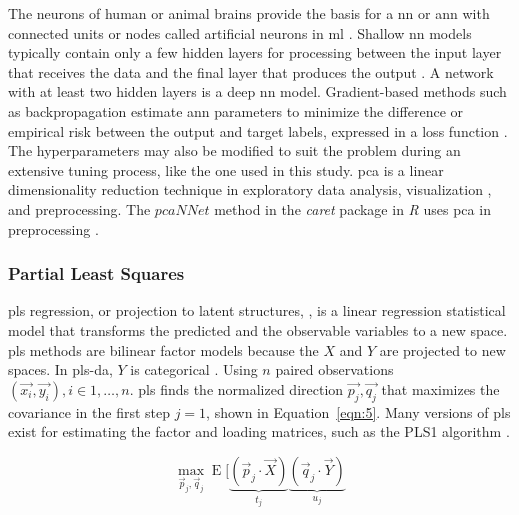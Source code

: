 \let\LaTeXcline\cline\documentclass[sn-mathphys-num]{sn-jnl}\let\cline\LaTeXcline
\begin{document}
The neurons of human or animal brains provide the basis for a \acrfull{nn} or \acrfull{ann} with connected units or nodes called artificial neurons in \acrlong{ml} \cite{brahme2014comprehensive}. Shallow \acrshort{nn} models typically contain only a few hidden layers for processing between the input layer that receives the data and the final layer that produces the output \cite{olden2002illuminating}. A network with at least two hidden layers \cite{bishop2006pattern} is a deep \acrshort{nn} model. Gradient-based methods such as backpropagation estimate \acrshort{ann} parameters \cite{vapnik2013nature} to minimize the difference or empirical risk between the output and target labels, expressed in a loss function \cite{goodfellow2016deep}. The hyperparameters may also be modified to suit the problem \cite{probst2019tunability} during an extensive tuning process, like the one used in this study. \acrfull{pca} \cite{stewart2019introduction} is a linear dimensionality reduction technique in exploratory data analysis, visualization \cite{jolliffe2016principal}, and preprocessing. The $pcaNNet$ method in the \textit{caret} package in \textit{R} uses \acrshort{pca} in preprocessing \cite{Kuhn2007, kuhn2008building, kuhn2013applied}.

\subsubsection{Partial Least Squares}

\acrfull{pls} regression, or projection to latent structures, \cite{abdi2010partial}, is a linear regression statistical model that transforms the predicted and the observable variables to a new space. \acrshort{pls} methods are bilinear factor models because the $X$ and $Y$ are projected to new spaces. In \acrfull{pls-da}, $Y$ is categorical \cite{saebo2008lpls}. Using $n$ paired observations $\left(\vec{x_{i}}, \vec{y_{i}}\right), i \in 1, \dots, n$. \acrshort{pls} finds the normalized direction $\vec{p_{j}}, \vec{q_{j}}$ that maximizes the covariance in the first step $j = 1$, shown in Equation~\ref{eqn:5}. Many versions of \acrshort{pls} exist for estimating the factor and loading matrices, such as the PLS1 algorithm \cite{GONZALEZ2023104876}.

\begin{equation}
	\max_{{\vec{p}}_{j},{\vec{q}}_{j}}\operatorname{E} [\underbrace{({\vec{p}}_{j}\cdot {\vec{X}})}_{t_{j}}\underbrace{({\vec{q}}_{j}\cdot {\vec{Y}})}_{u_{j}}
	\label{eqn:5}
\end{equation}
\end{document}
